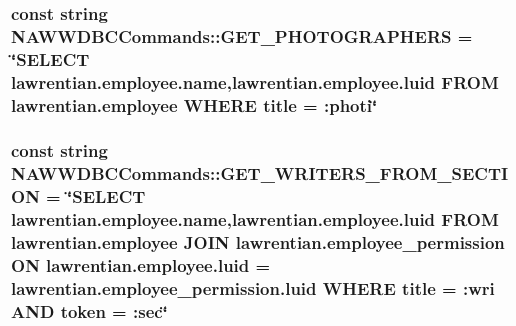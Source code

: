 \subsubsection[{G\+E\+T\+\_\+\+P\+H\+O\+T\+O\+G\+R\+A\+P\+H\+E\+R\+S}]{\setlength{\rightskip}{0pt plus 5cm}const string N\+A\+W\+W\+D\+B\+C\+Commands\+::\+G\+E\+T\+\_\+\+P\+H\+O\+T\+O\+G\+R\+A\+P\+H\+E\+R\+S = \char`\"{}S\+E\+L\+E\+C\+T lawrentian.\+employee.\+name,lawrentian.\+employee.\+luid F\+R\+O\+M lawrentian.\+employee W\+H\+E\+R\+E title = \+:photi\char`\"{}}\label{namespace_n_a_w_w_d_b_c_commands_a85f29126f3ec88817556a57c801da32c}
\hypertarget{namespace_n_a_w_w_d_b_c_commands_abace88a9f6f519876b781aa0ca7bf74f}{}
\subsubsection[{G\+E\+T\+\_\+\+W\+R\+I\+T\+E\+R\+S\+\_\+\+F\+R\+O\+M\+\_\+\+S\+E\+C\+T\+I\+O\+N}]{\setlength{\rightskip}{0pt plus 5cm}const string N\+A\+W\+W\+D\+B\+C\+Commands\+::\+G\+E\+T\+\_\+\+W\+R\+I\+T\+E\+R\+S\+\_\+\+F\+R\+O\+M\+\_\+\+S\+E\+C\+T\+I\+O\+N = \char`\"{}S\+E\+L\+E\+C\+T lawrentian.\+employee.\+name,lawrentian.\+employee.\+luid F\+R\+O\+M lawrentian.\+employee J\+O\+I\+N lawrentian.\+employee\+\_\+permission O\+N lawrentian.\+employee.\+luid = lawrentian.\+employee\+\_\+permission.\+luid W\+H\+E\+R\+E title = \+:wri A\+N\+D token = \+:sec\char`\"{}}\label{namespace_n_a_w_w_d_b_c_commands_abace88a9f6f519876b781aa0ca7bf74f}
